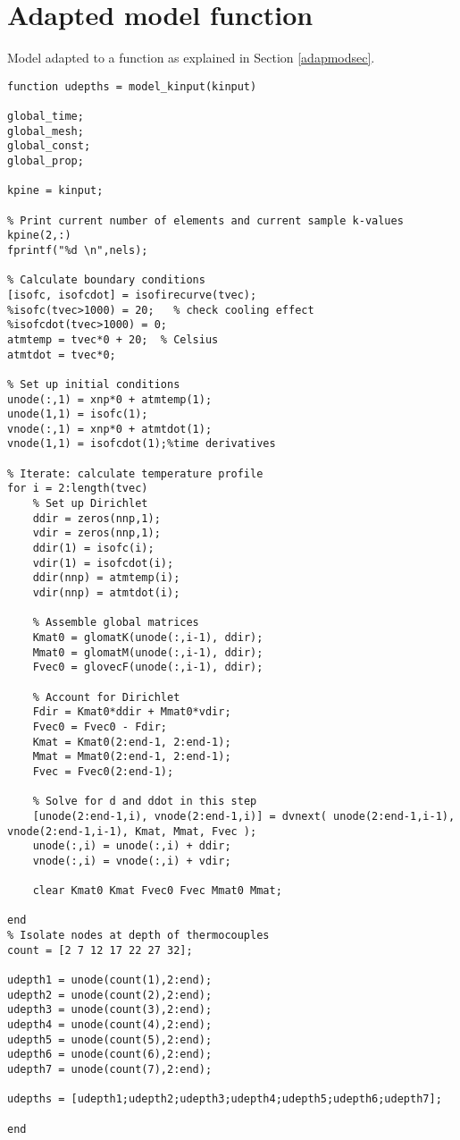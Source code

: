 \section*{Adapted model function}
Model adapted to a function as explained in Section \ref{adapmodsec}.
\begin{lstlisting}
function udepths = model_kinput(kinput)

global_time;
global_mesh;
global_const;
global_prop;

kpine = kinput;

% Print current number of elements and current sample k-values 
kpine(2,:)
fprintf("%d \n",nels);

% Calculate boundary conditions
[isofc, isofcdot] = isofirecurve(tvec);
%isofc(tvec>1000) = 20;   % check cooling effect
%isofcdot(tvec>1000) = 0;
atmtemp = tvec*0 + 20;  % Celsius
atmtdot = tvec*0;

% Set up initial conditions
unode(:,1) = xnp*0 + atmtemp(1);
unode(1,1) = isofc(1);
vnode(:,1) = xnp*0 + atmtdot(1);
vnode(1,1) = isofcdot(1);%time derivatives

% Iterate: calculate temperature profile
for i = 2:length(tvec)
    % Set up Dirichlet
    ddir = zeros(nnp,1);
    vdir = zeros(nnp,1);
    ddir(1) = isofc(i);
    vdir(1) = isofcdot(i);
    ddir(nnp) = atmtemp(i);
    vdir(nnp) = atmtdot(i);
    
    % Assemble global matrices
    Kmat0 = glomatK(unode(:,i-1), ddir);
    Mmat0 = glomatM(unode(:,i-1), ddir);
    Fvec0 = glovecF(unode(:,i-1), ddir);
    
    % Account for Dirichlet
    Fdir = Kmat0*ddir + Mmat0*vdir;
    Fvec0 = Fvec0 - Fdir;
    Kmat = Kmat0(2:end-1, 2:end-1);
    Mmat = Mmat0(2:end-1, 2:end-1);
    Fvec = Fvec0(2:end-1);
    
    % Solve for d and ddot in this step
    [unode(2:end-1,i), vnode(2:end-1,i)] = dvnext( unode(2:end-1,i-1), vnode(2:end-1,i-1), Kmat, Mmat, Fvec );
    unode(:,i) = unode(:,i) + ddir;
    vnode(:,i) = vnode(:,i) + vdir;
    
    clear Kmat0 Kmat Fvec0 Fvec Mmat0 Mmat;
    
end
% Isolate nodes at depth of thermocouples
count = [2 7 12 17 22 27 32];

udepth1 = unode(count(1),2:end);
udepth2 = unode(count(2),2:end);
udepth3 = unode(count(3),2:end);
udepth4 = unode(count(4),2:end);
udepth5 = unode(count(5),2:end);
udepth6 = unode(count(6),2:end);
udepth7 = unode(count(7),2:end);

udepths = [udepth1;udepth2;udepth3;udepth4;udepth5;udepth6;udepth7];

end


\end{lstlisting}

